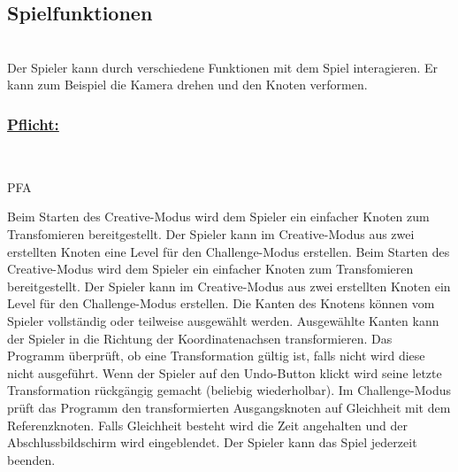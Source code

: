 %
%


\subsection{Spielfunktionen}

%
%
\renewcommand{\K}{}
%
%

~\\
Der Spieler kann durch verschiedene Funktionen mit dem Spiel interagieren. Er kann zum Beispiel die Kamera drehen und den Knoten verformen. 
\\

%
%
\subsubsection*{\underline{Pflicht:}}~\\

\begin{ids}{\gls{PFA\K}}

	\id[ 90] Beim Starten des Creative-Modus wird dem Spieler ein einfacher Knoten zum Transfomieren bereitgestellt.
 	\id[100] Der Spieler kann im Creative-Modus aus zwei erstellten Knoten eine Level für den Challenge-Modus erstellen.
 	\id[ 110] Beim Starten des Creative-Modus wird dem Spieler ein einfacher Knoten  zum Transfomieren bereitgestellt.
 	\id[ 120] Der Spieler kann im Creative-Modus aus zwei erstellten Knoten ein Level für den Challenge-Modus erstellen.
 	\id[ 130] Die Kanten des Knotens können vom Spieler vollständig oder teilweise ausgewählt werden.
 	\id[ 140] Ausgewählte Kanten kann der Spieler in die Richtung der Koordinatenachsen transformieren.
 	\id[ 150] Das Programm überprüft, ob eine Transformation gültig ist, falls nicht wird diese nicht ausgeführt.
 	\id[ 160] Wenn der Spieler auf den Undo-Button klickt wird seine letzte Transformation rückgängig gemacht (beliebig wiederholbar). 
 	\id[ 170] Im Challenge-Modus prüft das Programm den transformierten Ausgangsknoten auf Gleichheit mit dem Referenzknoten. Falls Gleichheit besteht wird die Zeit angehalten und der Abschlussbildschirm wird eingeblendet.
 	\id[ 180] Der Spieler kann das Spiel jederzeit beenden.
 	
 	
 	
	
\end{ids}

~\\


